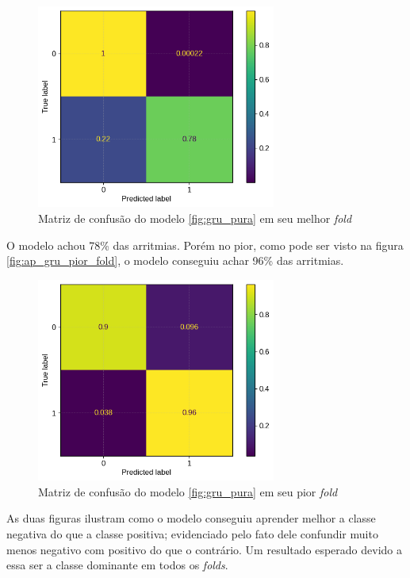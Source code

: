 \documentclass[
    12pt,                %
    openright,           %
    oneside,             %
    a4paper,             %
    brazil               %
]{abntex2}
\begin{document}
\begin{figure}[H]
  \centering
   \includegraphics[width=0.7\textwidth]{figuras/modelos_resultados/gru/matriz_confusao_melhor_fold_gru.png} %
  \caption{Matriz de confusão do modelo \ref{fig:gru_pura} em seu melhor \textit{fold}}
  \label{fig:matriz_confusao_melhor_fold_gru}
\end{figure}

O modelo achou 78\% das arritmias. Porém no pior, como pode ser visto na figura \ref{fig:ap_gru_pior_fold}, o modelo conseguiu achar 96\% das arritmias.

\begin{figure}[H]
  \centering
   \includegraphics[width=0.7\textwidth]{figuras/modelos_resultados/gru/matriz_confusao_pior_fold_gru.png} %
  \caption{Matriz de confusão do modelo \ref{fig:gru_pura} em seu pior \textit{fold}}
  \label{fig:matriz_confusao_pior_fold_gru}
\end{figure}

As duas figuras ilustram como o modelo conseguiu aprender melhor a classe negativa do que a classe positiva; evidenciado pelo fato dele confundir
muito menos negativo com positivo do que o contrário. Um resultado esperado devido a essa ser a classe dominante em todos os \textit{folds}.
\end{document}
